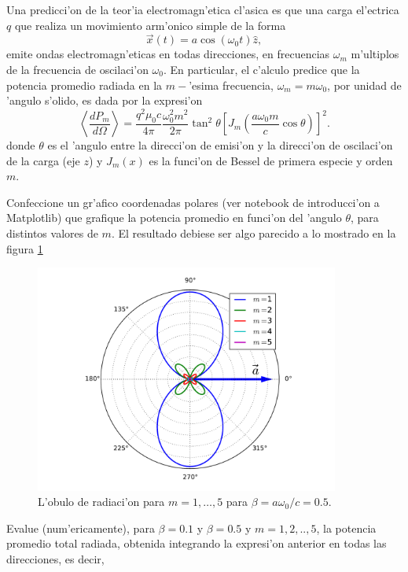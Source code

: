 \documentclass[11pt]{exam}
\begin{document}
\begin{questions}

\item Una predicci'on de la teor'ia electromagn'etica cl'asica es que una carga el'ectrica $q$ que realiza un movimiento arm'onico simple de la forma
\begin{equation}
\vec{x}(t) = a\cos(\omega_0t)\hat{z},
\end{equation}
emite ondas electromagn'eticas en todas direcciones, en frecuencias $\omega_m$ m'ultiplos  de la frecuencia de oscilaci'on $\omega_0$. En particular, el c'alculo predice que la potencia promedio radiada en la $m-$'esima frecuencia, $\omega_m = m\omega_0$, por unidad de 'angulo s'olido, es dada por la expresi'on
\begin{equation}
\left\langle \frac{dP_{m}}{d\Omega}\right\rangle
=\frac{q^2\mu_0 c}{4\pi}\frac{\omega_0^2m^2}{2\pi}\tan^2\theta\left[ J_{m}\left(\frac{a\omega_0 m}{c}\cos\theta\right)  \right]^2.
\end{equation}
donde $\theta$ es el 'angulo entre la direcci'on de emisi'on y la direcci'on de oscilaci'on de la carga (eje $z$) y $J_m(x)$ es la funci'on de Bessel de primera especie y orden $m$.
\begin{parts}
\item Confeccione un gr'afico coordenadas polares (ver notebook de introducci'on a Matplotlib) que grafique la potencia promedio en funci'on del 'angulo $\theta$, para distintos valores de $m$. El resultado debiese ser algo parecido a lo mostrado en la figura \ref{TER2}
\begin{figure}[ht]
\centerline{\includegraphics[width=10cm]{fig-mas.pdf}}
\caption{L'obulo de radiaci'on para $m=1,\dots,5$ para $\beta=a\omega_0/c=0.5$.}
\label{TER2}
\end{figure}
\item Evalue (num'ericamente), para $\beta =0.1$ y $\beta = 0.5$ y $m = 1,2,..,5$,  la potencia promedio total radiada, obtenida integrando la expresi'on anterior en todas las direcciones, es decir,

\end{parts}
\end{questions}
\end{document}
